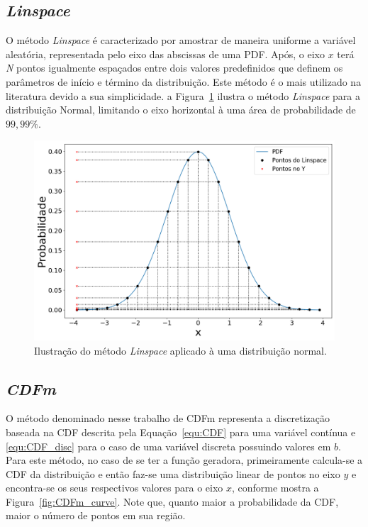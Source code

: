 \subsection{\textit{Linspace}}
O método \textit{Linspace} é caracterizado por amostrar de maneira uniforme a variável aleatória, representada pelo eixo das abscissas de uma \ac{PDF}. Após, o eixo $ x $ terá \textit{N} pontos igualmente espaçados entre dois valores predefinidos que definem os parâmetros de início e término da distribuição. Este método é o mais utilizado na literatura devido a sua simplicidade. a Figura~\ref{fig:linspace_curve} ilustra o método \textit{Linspace} para a distribuição Normal, limitando o eixo horizontal à uma área de probabilidade de $99,99\%$.


\begin{figure}[H]
	\centering
	\includegraphics[width=0.7\linewidth]{./figuras/normal_1}
	\caption{Ilustração do método \textit{Linspace} aplicado à uma distribuição normal.}
	\label{fig:linspace_curve}
\end{figure}


\subsection{\textit{CDFm}}
O método denominado nesse trabalho de \ac{CDFm} representa a discretização baseada na \ac{CDF} descrita pela Equação~\eqref{equ:CDF} para uma variável contínua e \eqref{equ:CDF_disc} para o caso de uma variável discreta possuindo valores em $ b $. Para este método, no caso de se ter a função geradora, primeiramente calcula-se a \ac{CDF} da distribuição e então faz-se uma distribuição linear de pontos no eixo $ y $ e encontra-se os seus respectivos valores para o eixo $ x $, conforme mostra a Figura~\ref{fig:CDFm_curve}. Note que, quanto maior a probabilidade da \ac{CDF}, maior o número de pontos em sua região.



